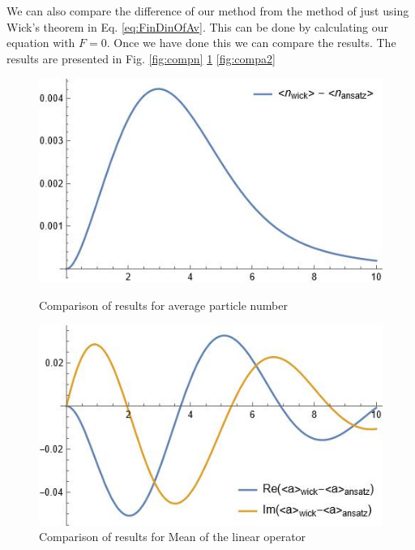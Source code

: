 \documentclass[12pt]{article}
\theoremstyle{definition}
\begin{document}
	We can also compare the difference of our method from the method of just using Wick's theorem in Eq. \ref{eq:FinDinOfAv}. This can be done by calculating our equation with $F = 0$. Once we have done this we can compare the results. The results are presented in Fig. \ref{fig:compn} \ref{fig:compa} \ref{fig:compa2}
	
	
	\begin{figure}[h!]
		\begin{center}
			\begin{minipage}[h!]{0.45\linewidth}
				\includegraphics[width=1\linewidth]{Comparen.JPG}
				\caption{Comparison of results for average particle number}
				\label{fig:compn}
			\end{minipage}
			\hfil
			\begin{minipage}[h!]{0.45\linewidth}
				\includegraphics[width=1\linewidth]{Comparea.JPG}
				\caption{Comparison of results for Mean of the linear operator}
				\label{fig:compa}
			\end{minipage}
			\hfil
			\begin{minipage}[h!]{0.45\linewidth}

\end{minipage}
\end{center}
\end{figure}
\end{document}
